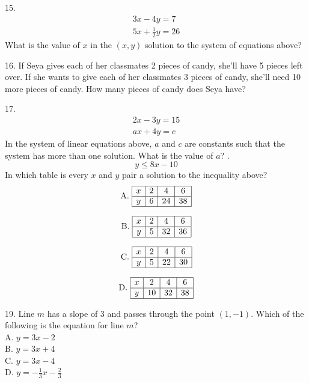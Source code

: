 \documentclass[../satmath.tex]{subfiles}
\begin{document}
15. 
\begin{align*}
3x-4y=7\\
5x+\frac{1}{2}y=26
\end{align*}
What is the value of $x$ in the $(x,y)$ solution to the system of equations above?
\medbreak

16. If Seya gives each of her classmates 2 pieces of candy, she'll have 5 pieces left over. If she wants to give each of her classmates 3 pieces 
of candy, she'll need 10 more pieces of candy. How many pieces of candy does Seya have?
\medbreak

17. 
\begin{align*}
2x-3y=15\\
ax+4y=c
\end{align*}
In the system of linear equations above, $a$ and $c$ are constants such that the system has more than one solution. What is the value of $a$?
. 
\[y\leq 8x-10\]
In which table is every $x$ and $y$ pair a solution to the inequality above?\\
\[
\text{A. }
\begin{array}{|c|c|c|c|}
\hline
x & 2 & 4 & 6 \\ \hline
y & 6 & 24 & 38 \\ \hline
\end{array}
\]

\[
\text{B. }
\begin{array}{|c|c|c|c|}
\hline
x & 2 & 4 & 6 \\ \hline
y & 5 & 32 & 36 \\ \hline
\end{array}
\]

\[
\text{C. }
\begin{array}{|c|c|c|c|}
\hline
x & 2 & 4 & 6 \\ \hline
y & 5 & 22 & 30 \\ \hline
\end{array}
\]

\[
\text{D. }
\begin{array}{|c|c|c|c|}
\hline
x & 2 & 4 & 6 \\ \hline
y & 10 & 32 & 38 \\ \hline
\end{array}
\]
\medbreak

19. Line $m$ has a slope of 3 and passes through the point $(1,-1)$. Which of the following is the equation for line $m$?\\
A. $y=3x-2$\\
B. $y=3x+4$\\
C. $y=3x-4$\\
D. $y=-\frac{1}{3}x-\frac{2}{3}$
\medbreak
\end{document}
